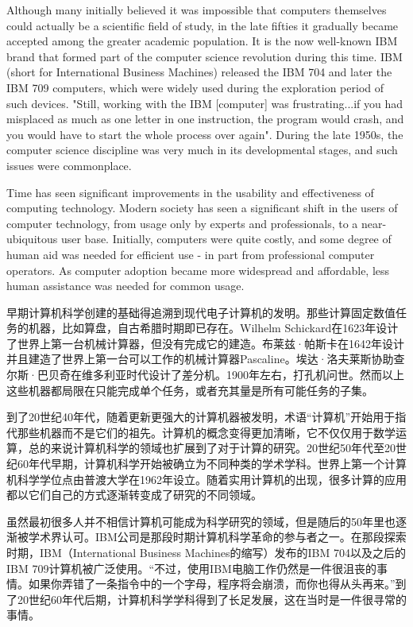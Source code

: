 Although many initially believed it was impossible that computers themselves could actually be a scientific field of study, in the late fifties it gradually became accepted among the greater academic population. It is the now well-known IBM brand that formed part of the computer science revolution during this time. IBM (short for International Business Machines) released the IBM 704 and later the IBM 709 computers, which were widely used during the exploration period of such devices. "Still, working with the IBM [computer] was frustrating...if you had misplaced as much as one letter in one instruction, the program would crash, and you would have to start the whole process over again". During the late 1950s, the computer science discipline was very much in its developmental stages, and such issues were commonplace.

Time has seen significant improvements in the usability and effectiveness of computing technology. Modern society has seen a significant shift in the users of computer technology, from usage only by experts and professionals, to a near-ubiquitous user base. Initially, computers were quite costly, and some degree of human aid was needed for efficient use - in part from professional computer operators. As computer adoption became more widespread and affordable, less human assistance was needed for common usage.

早期计算机科学创建的基础得追溯到现代电子计算机的发明。那些计算固定数值任务的机器，比如算盘，自古希腊时期即已存在。Wilhelm Schickard在1623年设计了世界上第一台机械计算器，但没有完成它的建造。布莱兹·帕斯卡在1642年设计并且建造了世界上第一台可以工作的机械计算器Pascaline。埃达·洛夫莱斯协助查尔斯·巴贝奇在维多利亚时代设计了差分机。1900年左右，打孔机问世。然而以上这些机器都局限在只能完成单个任务，或者充其量是所有可能任务的子集。


到了20世纪40年代，随着更新更强大的计算机器被发明，术语“计算机”开始用于指代那些机器而不是它们的祖先。计算机的概念变得更加清晰，它不仅仅用于数学运算，总的来说计算机科学的领域也扩展到了对于计算的研究。20世纪50年代至20世纪60年代早期，计算机科学开始被确立为不同种类的学术学科。世界上第一个计算机科学学位点由普渡大学在1962年设立。随着实用计算机的出现，很多计算的应用都以它们自己的方式逐渐转变成了研究的不同领域。

虽然最初很多人并不相信计算机可能成为科学研究的领域，但是随后的50年里也逐渐被学术界认可。IBM公司是那段时期计算机科学革命的参与者之一。在那段探索时期，IBM（International Business Machines的缩写）发布的IBM 704以及之后的IBM 709计算机被广泛使用。“不过，使用IBM电脑工作仍然是一件很沮丧的事情。如果你弄错了一条指令中的一个字母，程序将会崩溃，而你也得从头再来。”到了20世纪60年代后期，计算机科学学科得到了长足发展，这在当时是一件很寻常的事情。


